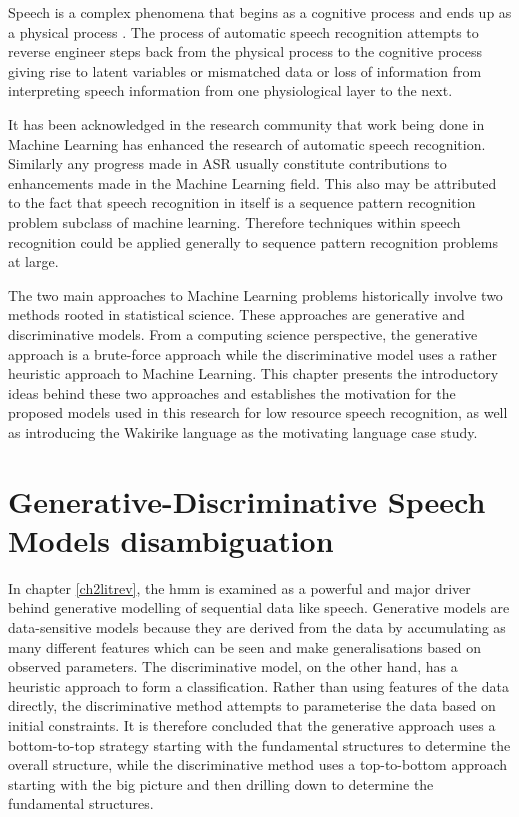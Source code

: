 Speech is a complex phenomena that begins as a cognitive process and ends up as a physical process \citep{becchetti1998}.  The process of automatic speech recognition attempts to reverse engineer steps back from the physical process to the cognitive process giving rise to latent variables or mismatched data or loss of information from interpreting speech information from one physiological layer to the next.

It has been acknowledged in the research community \citep{2015watanabe,deng2013machine}  that work being done in Machine Learning has enhanced the research of automatic speech recognition.   Similarly any progress made in ASR usually constitute contributions to enhancements made in the Machine Learning field.  This also may be attributed to the fact that speech recognition in itself is a sequence pattern recognition problem subclass of machine learning.  Therefore techniques within speech recognition could be applied generally to sequence pattern recognition problems at large.

The two main approaches to Machine Learning problems historically involve two methods rooted in statistical science.  These approaches are generative and discriminative models.  From a computing science perspective, the generative approach is a brute-force approach while the discriminative model uses a rather heuristic approach to Machine Learning. This chapter presents the introductory ideas behind these two approaches and establishes the motivation for the proposed models used in this research for low resource speech recognition, as well as introducing the Wakirike language as the motivating language case study.

\section{Generative-Discriminative Speech Models disambiguation}
\pagestyle{fancy}
In chapter \ref{ch2litrev}, the \acrfull{hmm} is examined as a powerful and major driver behind generative modelling of sequential data like speech.  Generative models are data-sensitive models because they are derived from the data by accumulating as many different features which can be seen and make generalisations based on observed parameters. The discriminative model, on the other hand, has a heuristic approach to form a classification.  Rather than using features of the data directly, the discriminative method attempts to parameterise the data based on initial constraints\citep{lasserre2006principled}. It is therefore concluded that the generative approach uses a bottom-to-top strategy starting with the fundamental structures to determine the overall structure, while the discriminative method uses a top-to-bottom approach starting with the big picture and then drilling down to determine the fundamental structures.

